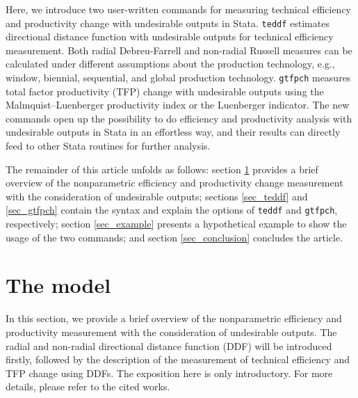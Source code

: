 Here, we introduce two user-written commands for measuring technical efficiency and productivity change with undesirable outputs in Stata. {\tt teddf} estimates directional distance function with undesirable outputs for technical efficiency measurement. Both radial Debreu-Farrell and non-radial Russell measures can be calculated under different assumptions about the production technology, e.g., window, biennial, sequential, and global production technology.
{\tt gtfpch} measures total factor productivity (TFP) change with undesirable outputs using the Malmquist–Luenberger productivity index or the Luenberger indicator. 
The new commands open up the possibility to do efficiency and productivity analysis with undesirable outputs in Stata in an effortless way, and their results can directly feed to other Stata routines for further analysis. 

The remainder of this article unfolds as follows: 
section \ref{sec_method} provides a brief overview of the nonparametric efficiency and productivity change measurement with the consideration of undesirable outputs; 
sections \ref{sec_teddf} and \ref{sec_gtfpch} contain the syntax and explain the options of {\tt teddf} and {\tt gtfpch}, respectively; 
section \ref{sec_example} presents a hypothetical example to show the usage of the two commands; 
and section \ref{sec_conclusion} concludes the article.

\section{The model}\label{sec_method}
In this section, we provide a brief overview of the nonparametric efficiency and productivity measurement with the consideration of undesirable outputs. 
The radial and non-radial directional distance function (DDF) will be introduced firstly, followed by the description of the measurement of technical efficiency and TFP change using DDFs. 
The exposition here is only introductory. For more details, please refer to the cited works.

